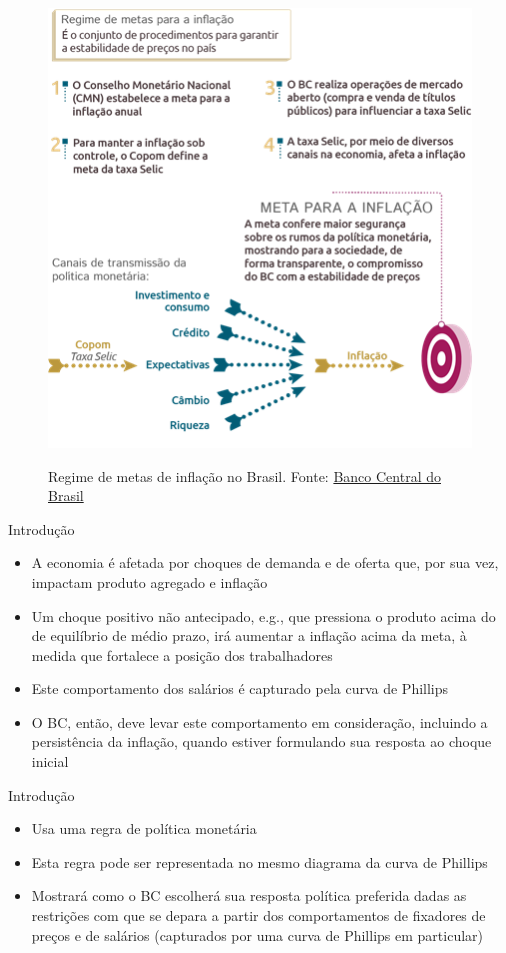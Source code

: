 \documentclass[10pt]{beamer}
\begin{document}
\begin{frame}
    \begin{figure}
        \href{https://www.bcb.gov.br/content/acessoinformacao/SiteAssets/Lists/PerguntasFrequentes/NewForm/Imagem4.png}{\includegraphics[width=.45\textwidth]{./figures/aula16_fig1.png}}
        \caption{Regime de metas de inflação no Brasil. Fonte: \href{https://www.bcb.gov.br/content/acessoinformacao/SiteAssets/Lists/PerguntasFrequentes/NewForm/Imagem4.png}{Banco Central do Brasil}}
    \end{figure}
\end{frame}

\begin{frame}
    {Introdução}
    \medskip
    \begin{itemize}
        \item A economia é afetada por choques de demanda e de oferta que, por sua vez, impactam produto agregado e inflação\bigskip
        \item Um choque positivo não antecipado, e.g., que pressiona o produto acima do de equilíbrio de médio prazo, irá aumentar a inflação acima da meta, à medida que fortalece a posição dos trabalhadores\bigskip
        \item Este comportamento dos salários é capturado pela curva de Phillips\bigskip
        \item O BC, então, deve levar este comportamento em consideração, incluindo a persistência da inflação, quando estiver formulando sua resposta ao choque inicial
    \end{itemize}
\end{frame}

\begin{frame}
    {Introdução}
    \medskip
    \begin{itemize}
        \item Usa uma regra de política monetária\bigskip
        \item Esta regra pode ser representada no mesmo diagrama da curva de Phillips\bigskip
        \item Mostrará como o BC escolherá sua resposta política preferida dadas as restrições com que se depara a partir dos comportamentos de fixadores de preços e de salários (capturados por uma curva de Phillips em particular)
    \end{itemize}
\end{frame}
\end{document}
